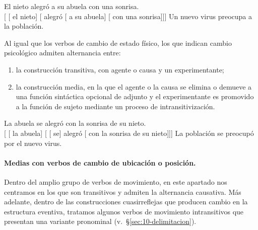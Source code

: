 \begin{exe}
  \ex
    \begin{xlist}
      \ex\label{ex:10-abuela-a} El nieto alegró a su abuela con una sonrisa.\\
          {}[ [ el nieto] [
          alegró [ a su abuela] [
          con una sonrisa]]]
      \ex\label{ex:10-abuela-b} Un nuevo virus preocupa a la población.
    \end{xlist}
\end{exe}

Al igual que los verbos de cambio de estado físico, los que indican cambio
psicológico admiten alternancia entre:

\begin{enumerate}[label=\alph*)]
  \item la construcción transitiva, con agente  o causa
         y un experimentante;
  \item la construcción media, en la que el agente o la causa se elimina o
        demueve a una función sintáctica opcional de adjunto y el experimentante
        es promovido a la función de sujeto mediante un proceso de
        intransitivización.
\end{enumerate}

\begin{exe}
  \ex
    \begin{xlist}
      \ex La abuela se alegró con la sonrisa de su nieto.\\
          {}[ [ la abuela]
          [ [ se] alegró [ con la
          sonrisa de su nieto]]]
      \ex La población se preocupó por el nuevo virus.
    \end{xlist}
\end{exe}

\paragraph{Medias con verbos de cambio de ubicación o posición.} Dentro del
amplio grupo de verbos de movimiento, en este apartado nos centramos en los que
son transitivos y admiten la alternancia causativa. Más adelante, dentro de las
construcciones cuasirreflejas que producen cambio en la estructura eventiva,
tratamos algunos verbos de movimiento intransitivos que presentan una variante
pronominal (v.~§\ref{sec:10-delimitacion}).

